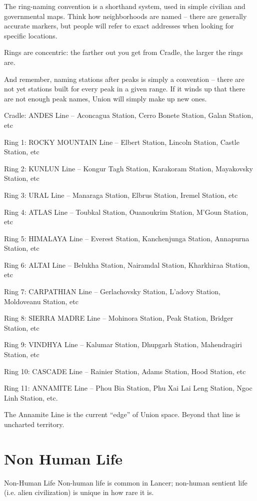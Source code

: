 The ring-naming convention is a shorthand system, used in simple civilian and governmental
maps. Think how neighborhoods are named -- there are generally accurate markers, but people
will refer to exact addresses when looking for specific locations.

Rings are concentric: the farther out you get from Cradle, the larger the rings are.

And remember, naming stations after peaks is simply a convention -- there are not yet stations
built for every peak in a given range. If it winds up that there are not enough peak names, Union
will simply make up new ones.


Cradle: ANDES  Line -- Aconcagua Station, Cerro Bonete Station, Galan Station, etc


Ring 1: ROCKY MOUNTAIN Line -- Elbert Station, Lincoln Station, Castle Station, etc


Ring 2: KUNLUN Line -- Kongur Tagh Station, Karakoram Station, Mayakovsky Station, etc


Ring 3: URAL Line -- Manaraga Station, Elbrus Station, Iremel Station, etc


Ring 4: ATLAS  Line -- Toubkal Station, Ouanoukrim Station, M’Goun Station, etc


Ring 5: HIMALAYA Line -- Everest Station, Kanchenjunga Station, Annapurna Station, etc


Ring 6: ALTAI  Line -- Belukha Station, Nairamdal Station, Kharkhiraa Station, etc





Ring 7: CARPATHIAN Line -- Gerlachovsky Station, L’adovy Station, Moldoveanu Station, etc


Ring 8: SIERRA MADRE Line -- Mohinora Station, Peak Station, Bridger Station, etc


Ring 9: VINDHYA Line -- Kalumar Station, Dhupgarh Station, Mahendragiri Station, etc


Ring 10: CASCADE Line -- Rainier Station, Adams Station, Hood Station, etc


Ring 11: ANNAMITE  Line -- Phou Bia Station, Phu Xai Lai Leng Station, Ngoc Linh Station, etc.


The Annamite Line is the current “edge” of Union space. Beyond that line is uncharted territory.

\section{Non Human Life}
Non-Human Life
Non-human life is common in Lancer; non-human sentient life (i.e. alien civilization) is unique in
how rare it is.



